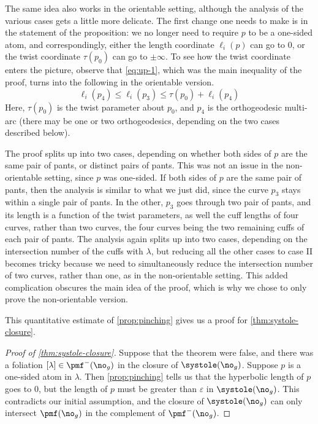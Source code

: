 \documentclass[12pt, reqno]{amsart}
\begin{document}
\begin{remark}
  The same idea also works in the orientable setting, although the analysis of the various cases gets a little more delicate.
  The first change one needs to make is in the statement of the proposition: we no longer need to require $p$ to be a one-sided atom, and correspondingly, either the length coordinate $\ell_i(p)$ can go to $0$, or the twist coordinate $\tau(p_0)$ can go to $\pm \infty$.
  To see how the twist coordinate enters the picture, observe that \eqref{eq:up-1}, which was the main inequality of the proof, turns into the following in the orientable version.
  \begin{equation}
    \label{eq:up-11}
    \ell_i(p_4)  \leq \ell_i(p_3) \leq \tau(p_0) + \ell_i(p_4)
  \end{equation}
  Here, $\tau(p_0)$ is the twist parameter about $p_0$, and $p_4$ is the orthogeodesic multi-arc (there may be one or two orthogeodesics, depending on the two cases described below).

  The proof splits up into two cases, depending on whether both sides of $p$ are the same pair of pants, or distinct pairs of pants.
  This was not an issue in the non-orientable setting, since $p$ was one-sided.
  If both sides of $p$ are the same pair of pants, then the analysis is similar to what we just did, since the curve $p_3$ stays within a single pair of pants.
  In the other, $p_3$ goes through two pair of pants, and its length is a function of the twist parameters, as well the cuff lengths of four curves, rather than two curves, the four curves being the two remaining cuffs of each pair of pants.
  The analysis again splits up into two cases, depending on the intersection number of the cuffs with $\lambda$, but reducing all the other cases to case II becomes tricky because we need to simultaneously reduce the intersection number of two curves, rather than one, as in the non-orientable setting.
  This added complication obscures the main idea of the proof, which is why we chose to only prove the non-orientable version.
\end{remark}

This quantitative estimate of \autoref{prop:pinching} gives us a proof for \autoref{thm:systole-closure}.
\begin{proof}[Proof of \autoref{thm:systole-closure}]
  Suppose that the theorem were false, and there was a foliation $[\lambda] \in \pmf^-(\no_g)$ in the closure of $\systole(\no_g)$.
  Suppose $p$ is a one-sided atom in $\lambda$.
  Then \autoref{prop:pinching} tells us that the hyperbolic length of $p$ goes to $0$, but the length of $p$ must be greater than $\varepsilon$ in $\systole(\no_g)$.
  This contradicts our initial assumption, and the closure of $\systole(\no_g)$ can only intersect $\pmf(\no_g)$ in the complement of $\pmf^-(\no_g)$.
\end{proof}
\end{document}
